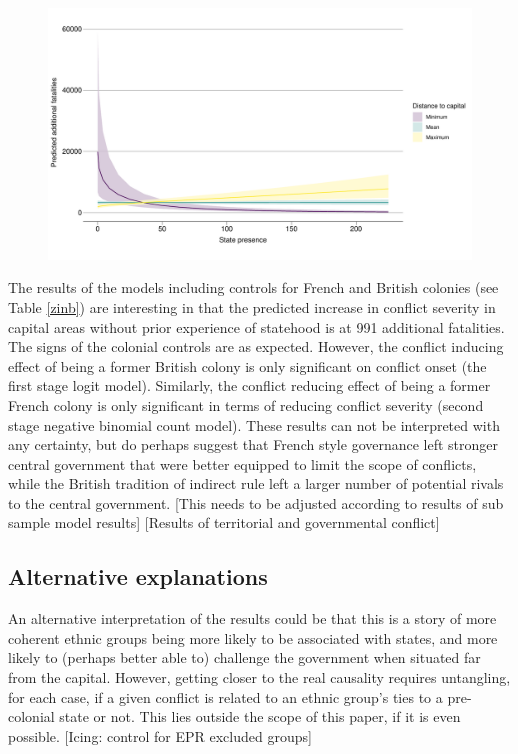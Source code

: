 \documentclass[12pt]{article}
\begin{document}
\begin{figure}[htpb]
	\centering
	\includegraphics[width=\linewidth]{"../R/Output/interdeathszinbplot.pdf"}
	\caption{}
	\label{deaths_zinb}
\end{figure}


The results of the models including controls for French and British colonies
(see Table \ref{zinb}) are interesting in that the predicted increase in conflict
severity in capital areas without prior experience of statehood is at 991
additional fatalities. The signs of the colonial controls are as
expected. However, the conflict inducing effect of being a former British
colony is only significant on conflict onset (the first stage logit
model). Similarly, the conflict reducing effect of being a former French colony
is only significant in terms of reducing conflict severity (second stage
negative binomial count model). These results can not be interpreted with any
certainty, but do perhaps suggest that French style governance left stronger
central government that were better equipped to limit the scope of conflicts,
while the British tradition of indirect rule left a larger number of potential
rivals to the central government. [This needs to be adjusted according to
results of sub sample model results] [Results of territorial and governmental
conflict]

\subsection{Alternative explanations} \label{Alternative explanations}

An alternative interpretation of the results could be that this is a
story of more coherent ethnic groups being more likely to be associated with
states, and more likely to (perhaps better able to) challenge the government
when situated far from the capital. However, getting closer to the real
causality requires untangling, for each case, if a given conflict is related to
an ethnic group's ties to a pre-colonial state or not. This lies outside the
scope of this paper, if it is even possible. [Icing: control for EPR excluded
groups]
\end{document}
